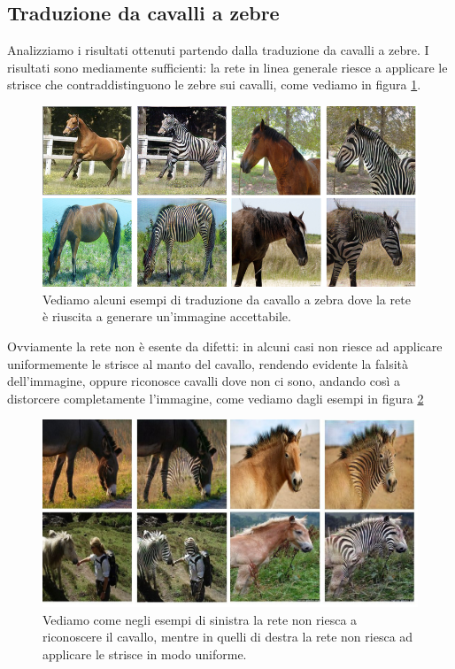 \subsection{Traduzione da cavalli a zebre}
Analizziamo i risultati ottenuti partendo dalla traduzione da cavalli a zebre. I risultati sono mediamente sufficienti: la rete in linea generale riesce a applicare le strisce che contraddistinguono le zebre sui cavalli, come vediamo in figura \ref{fig:Risultati Cycle GAN base (1)}.
\begin{figure}[H]
\begin{center}
\includegraphics[width=1\columnwidth]{images/risultati cyclegan zebre.png}
\end{center}
\caption{Vediamo alcuni esempi di traduzione da cavallo a zebra dove la rete è riuscita a generare un'immagine accettabile.}
\label{fig:Risultati Cycle GAN base (1)}
\end{figure} 
Ovviamente la rete non è esente da difetti: in alcuni casi non riesce ad applicare uniformemente le strisce al manto del cavallo, rendendo evidente la falsità dell'immagine, oppure riconosce cavalli dove non ci sono, andando così a distorcere completamente l'immagine, come vediamo dagli esempi in figura \ref{fig:Risultati Errati Cycle GAN (1)} 

\begin{figure}[H]
\begin{center}
\includegraphics[width=1\columnwidth]{images/CycleGan zebre error.jpeg}
\end{center}
\caption{Vediamo come negli esempi di sinistra la rete non riesca a riconoscere il cavallo, mentre in quelli di destra la rete non riesca ad applicare le strisce in modo uniforme.}
\label{fig:Risultati Errati Cycle GAN (1)}
\end{figure} 

